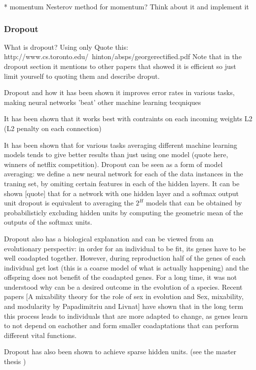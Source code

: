 \documentclass[11pt, fleqn, twoside]{article}
\begin{document}
  * momentum
    Nesterov method for momentum? Think about it and implement it


\subsubsection{Dropout}

  What is dropout? Using only
  Quote this:
  http://www.cs.toronto.edu/~hinton/absps/georgerectified.pdf
  Note that in the dropout section it mentions to other papers that showed it is efficient so
  just limit yourself to quoting them and describe droput.

  Dropout and how it has been shown it improves error rates in  various tasks, making neural networks 'beat' other machine learning tecqniques \cite{Srivastava2013}

  It has been shown that it works best with contraints on each incoming weights L2 (L2 penalty on each connection)

  It has been shown that for various tasks averaging different machine learning models tends to give better results than just using one model (quote here, winners of netflix competition). Dropout can be seen as a form of model averaging:
  we define a new neural network for each of the data instances in the traning set, by omiting certain features in each of the hidden layers.
  It can be shown [quote] that for a network with one hidden layer and a softmax output unit dropout is equivalent to averaging the $2^H$ models that can be obtained by probabilisticly excluding hidden units by computing the geometric mean of the outputs of the softmax units.

  Dropout also has a biological explanation and can be viewed from an evolutionary perspectiv: in order for an individual to be fit, its genes have to be well coadapted together. However, during reproduction half of the genes of each individual get lost (this is a coarse model of what is actually happening) and the offspring does not benefit of the coadapted genes. For a long time, it was not understood why can be a desired outcome in the evolution of a species. Recent papers [A mixability theory for the role of sex in evolution
  and Sex, mixability, and modularity by Papadimitriu and Livnat] have shown that in the long term this process leads to individuals that are more adapted to change, as genes learn to not depend on eachother and form smaller coadaptations that can perform different vital functions.

  Dropout has also been shown to achieve sparse hidden units. (see the master thesis )
\end{document}
